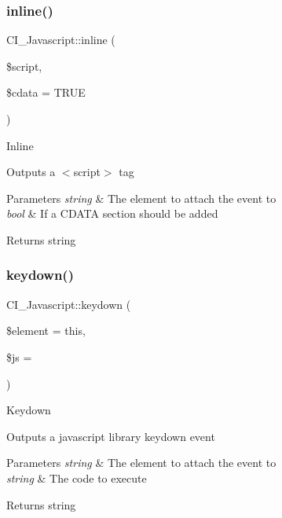 \subsubsection{\texorpdfstring{inline()}{inline()}}
{\footnotesize\ttfamily C\+I\+\_\+\+Javascript\+::inline (\begin{DoxyParamCaption}\item[{}]{\$script,  }\item[{}]{\$cdata = {\ttfamily TRUE} }\end{DoxyParamCaption})}

Inline

Outputs a $<$script$>$ tag


\begin{DoxyParams}{Parameters}
{\em string} & The element to attach the event to \\
\hline
{\em bool} & If a C\+D\+A\+TA section should be added \\
\hline
\end{DoxyParams}
\begin{DoxyReturn}{Returns}
string 
\end{DoxyReturn}
\mbox{\label{class_c_i___javascript_a6ae7fcdb40c0f5fa662f54c76d2d3e2f}} 
\subsubsection{\texorpdfstring{keydown()}{keydown()}}
{\footnotesize\ttfamily C\+I\+\_\+\+Javascript\+::keydown (\begin{DoxyParamCaption}\item[{}]{\$element = {\ttfamily \textquotesingle{}this\textquotesingle{}},  }\item[{}]{\$js = {\ttfamily \textquotesingle{}\textquotesingle{}} }\end{DoxyParamCaption})}

Keydown

Outputs a javascript library keydown event


\begin{DoxyParams}{Parameters}
{\em string} & The element to attach the event to \\
\hline
{\em string} & The code to execute \\
\hline
\end{DoxyParams}
\begin{DoxyReturn}{Returns}
string 
\end{DoxyReturn}
\mbox{\label{class_c_i___javascript_af7e3a613fce6fd87fe0b2cbc5a4049d0}} 
